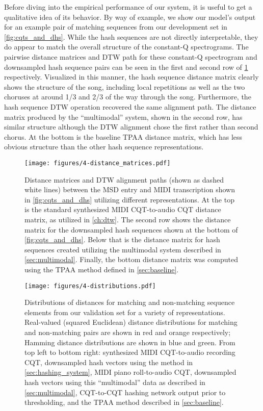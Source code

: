 Before diving into the empirical performance of our system, it is useful to get a qualitative idea of its behavior.
By way of example, we show our model's output for an example pair of matching sequences from our development set in \cref{fig:cqts_and_dhs}.
While the hash sequences are not directly interpretable, they do appear to match the overall structure of the constant-Q spectrograms.
The pairwise distance matrices and DTW path for these constant-Q spectrogram and downsampled hash sequence pairs can be seen in the first and second row of \cref{fig:distance_matrices} respectively.
Visualized in this manner, the hash sequence distance matrix clearly shows the structure of the song, including local repetitions as well as the two choruses at around 1/3 and 2/3 of the way through the song.
Furthermore, the hash sequence DTW operation recovered the same alignment path.
The distance matrix produced by the ``multimodal'' system, shown in the second row, has similar structure although the DTW alignment chose the first rather than second chorus.
At the bottom is the baseline TPAA distance matrix, which has less obvious structure than the other hash sequence representations.

\begin{figure}
  \texttt{[image: figures/4-distance\_matrices.pdf]}
  \caption[Distance matrices utilizing different representations]{Distance matrices and DTW alignment paths (shown as dashed white lines) between the MSD entry and MIDI transcription shown in \cref{fig:cqts_and_dhs} utilizing different representations.
At the top is the standard synthesized MIDI CQT-to-audio CQT distance matrix, as utilized in \cref{ch:dtw}.
The second row shows the distance matrix for the downsampled hash sequences shown at the bottom of \cref{fig:cqts_and_dhs}.
Below that is the distance matrix for hash sequences created utilizing the multimodal system described in \cref{sec:multimodal}.
Finally, the bottom distance matrix was computed using the TPAA method defined in \cref{sec:baseline}.}
  \label{fig:distance_matrices}
\end{figure}

\begin{figure}
  \texttt{[image: figures/4-distributions.pdf]}
  \caption[Distributions of matching and non-matching distances]{Distributions of distances for matching and non-matching sequence elements from our validation set for a variety of representations.
Real-valued (squared Euclidean) distance distributions for matching and non-matching pairs are shown in red and orange respectively; Hamming distance distributions are shown in blue and green.
From top left to bottom right: synthesized MIDI CQT-to-audio recording CQT, downsampled hash vectors using the method in \ref{sec:hashing_system}, MIDI piano roll-to-audio CQT, downsampled hash vectors using this ``multimodal'' data as described in \cref{sec:multimodal}, CQT-to-CQT hashing network output prior to thresholding, and the TPAA method described in \cref{sec:baseline}.}
  \label{fig:distributions}
\end{figure}

